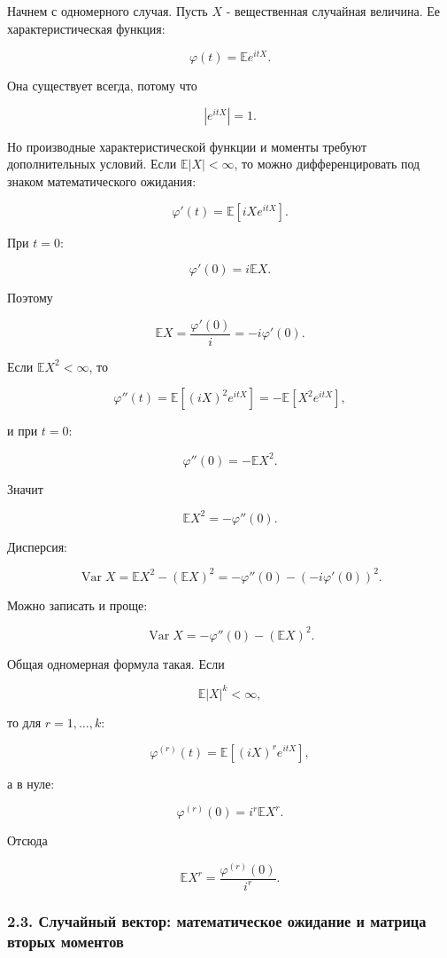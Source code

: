 \documentclass[
  11pt,
  a4paper,
]{article}
\begin{document}
Начнем с одномерного случая. Пусть \(X\) - вещественная случайная
величина. Ее характеристическая функция:

\[
\varphi(t)=\mathbb E e^{itX}.
\]

Она существует всегда, потому что

\[
|e^{itX}|=1.
\]

Но производные характеристической функции и моменты требуют
дополнительных условий. Если \(\mathbb E|X|<\infty\), то можно
дифференцировать под знаком математического ожидания:

\[
\varphi'(t)=\mathbb E\left[iXe^{itX}\right].
\]

При \(t=0\):

\[
\varphi'(0)=i\mathbb EX.
\]

Поэтому

\[
\mathbb EX=\frac{\varphi'(0)}{i}=-i\varphi'(0).
\]

Если \(\mathbb EX^2<\infty\), то

\[
\varphi''(t)=\mathbb E\left[(iX)^2e^{itX}\right]
=
-\mathbb E\left[X^2e^{itX}\right],
\]

и при \(t=0\):

\[
\varphi''(0)=-\mathbb EX^2.
\]

Значит

\[
\mathbb EX^2=-\varphi''(0).
\]

Дисперсия:

\[
\operatorname{Var}X
=
\mathbb EX^2-(\mathbb EX)^2
=
-\varphi''(0)-(-i\varphi'(0))^2.
\]

Можно записать и проще:

\[
\operatorname{Var}X=-\varphi''(0)-(\mathbb EX)^2.
\]

Общая одномерная формула такая. Если

\[
\mathbb E|X|^k<\infty,
\]

то для \(r=1,\ldots,k\):

\[
\varphi^{(r)}(t)
=
\mathbb E\left[(iX)^r e^{itX}\right],
\]

а в нуле:

\[
\varphi^{(r)}(0)
=
i^r\mathbb EX^r.
\]

Отсюда

\[
\mathbb EX^r
=
\frac{\varphi^{(r)}(0)}{i^r}.
\]

\subsubsection{2.3. Случайный вектор: математическое ожидание и матрица
вторых
моментов}\label{ux441ux43bux443ux447ux430ux439ux43dux44bux439-ux432ux435ux43aux442ux43eux440-ux43cux430ux442ux435ux43cux430ux442ux438ux447ux435ux441ux43aux43eux435-ux43eux436ux438ux434ux430ux43dux438ux435-ux438-ux43cux430ux442ux440ux438ux446ux430-ux432ux442ux43eux440ux44bux445-ux43cux43eux43cux435ux43dux442ux43eux432}
\end{document}
